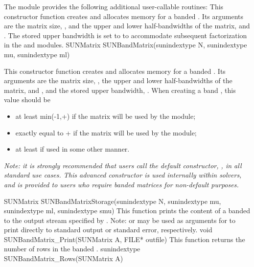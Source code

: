 The module {\sunmatband} provides the following additional user-callable routines:
{
  This constructor function creates and allocates memory for a banded .
  Its arguments are the matrix size, , and the upper and lower
  half-bandwidths of the matrix,  and .  The stored
  upper bandwidth is set to  to accommodate subsequent
  factorization in the {\sunlinsolband} and {\sunlinsollapband} modules.
}
{
  SUNMatrix SUNBandMatrix(sunindextype N, sunindextype mu,
  sunindextype ml)
}
{
  This constructor function creates and allocates memory for a banded .
  Its arguments are the matrix size, , the upper and lower
  half-bandwidths of the matrix,  and , and the stored
  upper bandwidth, .  When creating a band ,
  this value should be
  \begin{itemize}
  \item at least min(-1,+) if the matrix will be
    used by the {\sunlinsolband} module;
  \item exactly equal to + if the matrix will be used by
    the {\sunlinsollapband} module;
  \item at least  if used in some other manner.
  \end{itemize}
  \emph{Note: it is strongly recommended that users call the default
    constructor, , in all standard use cases.  This
    advanced constructor is used internally within {\sundials}
    solvers, and is provided to users who require banded matrices for
    non-default purposes.}
}
{
  SUNMatrix SUNBandMatrixStorage(sunindextype N, sunindextype mu,
  sunindextype ml, sunindextype smu)
}
{
  This function prints the content of a banded  to the
  output stream specified by .  Note: 
  or  may be used as arguments for  to print
  directly to standard output or standard error, respectively.
}
{
  void SUNBandMatrix\_Print(SUNMatrix A, FILE* outfile)
}
{
  This function returns the number of rows in the banded .
}
{
  sunindextype SUNBandMatrix\_Rows(SUNMatrix A)
}
